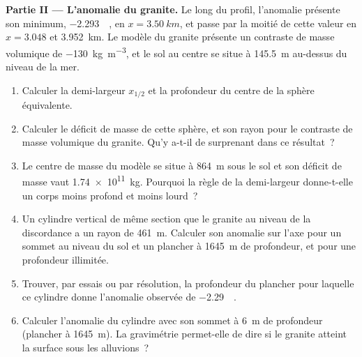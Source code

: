 \begin{problem}
\medskip\noindent\textbf{Partie II --- L'anomalie du granite.} Le long du
profil, l'anomalie présente son minimum, \qty{-2.293}{\milli\gal}, en
$x = \qty{3.50}{km}$, et passe par la moitié de cette valeur en $x = 3.048$ et
\qty{3.952}{km}. Le modèle du granite présente un contraste de masse volumique de
\qty{-130}{kg.m^{-3}}, et le sol au centre se situe à \qty{145.5}{m}
au-dessus du niveau de la mer.
\begin{enumerate}[resume]
\item Calculer la demi-largeur $x_{1/2}$ et la profondeur du centre de
  la sphère équivalente.
\item Calculer le déficit de masse de cette sphère, et son rayon pour le
  contraste de masse volumique du granite. Qu'y a-t-il de surprenant dans ce résultat~?
\item Le centre de masse du modèle se situe à \qty{864}{m} sous le sol et son
  déficit de masse vaut \qty{1.74e11}{kg}. Pourquoi la règle de la demi-largeur donne-t-elle un
  corps moins profond et moins lourd~?
\item Un cylindre vertical de même section que le granite au
  niveau de la discordance a un rayon de \qty{461}{m}. Calculer son anomalie sur l'axe
  pour un sommet au niveau du sol et un plancher à \qty{1645}{m} de profondeur, et pour une
  profondeur illimitée.
\item Trouver, par essais ou par résolution, la profondeur du plancher pour laquelle ce
  cylindre donne l'anomalie observée de \qty{-2.29}{\milli\gal}.
\item Calculer l'anomalie du cylindre avec son sommet à \qty{6}{m} de profondeur
  (plancher à \qty{1645}{m}). La gravimétrie permet-elle de dire si le granite atteint
  la surface sous les alluvions~?
\end{enumerate}


\end{problem}
